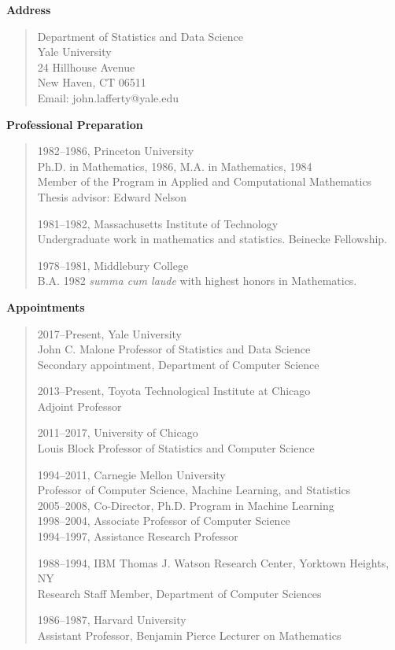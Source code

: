 \documentclass[pdftex,12pt]{article}
\begin{document}
\parindent=0pt
\pagestyle{empty}
\vskip-5pt
\def\surl#1{{\small\sl\url{#1}}}
\vskip2pt{\bf Address}

\begin{quote}
Department of Statistics and Data Science\\
Yale University\\
24 Hillhouse Avenue\\
New Haven, CT 06511\\
Email: {john.lafferty@yale.edu}
\end{quote}


\vskip1pt{\bf Professional Preparation}

\begin{quote}


1982--1986, Princeton University\\
Ph.D. in Mathematics, 1986,  M.A. in Mathematics, 1984\\
Member of the Program in Applied and Computational Mathematics\\
Thesis advisor: Edward Nelson
\vskip3pt

1981--1982, Massachusetts Institute of Technology\\
Undergraduate work in mathematics and statistics.  Beinecke Fellowship.
\vskip3pt

1978--1981, Middlebury College \\
B.A. 1982 {\em summa cum laude\/} with highest
honors in Mathematics.
\vskip5pt

\end{quote}


\vskip1pt{\bf Appointments}

\begin{quote}
2017--Present, Yale University \\
John C. Malone Professor of Statistics and Data Science\\
Secondary appointment, Department of Computer Science
\vskip5pt

2013--Present, Toyota Technological Institute at Chicago \\
Adjoint Professor
\vskip5pt

2011--2017, University of Chicago \\
Louis Block Professor of Statistics and Computer Science
\vskip5pt

1994--2011,  Carnegie Mellon University\\
Professor of Computer Science, Machine Learning, and Statistics\\[1pt]
2005--2008, Co-Director, Ph.D. Program in Machine Learning\\
1998--2004, Associate Professor of Computer Science\\
1994--1997, Assistance Research Professor
\vskip5pt

1988--1994, IBM Thomas J. Watson Research Center,
Yorktown Heights, NY\\
Research Staff Member, Department of Computer Sciences
\vskip5pt

1986--1987, Harvard University\\
Assistant Professor, Benjamin Pierce Lecturer on Mathematics
\end{quote}
\end{document}
